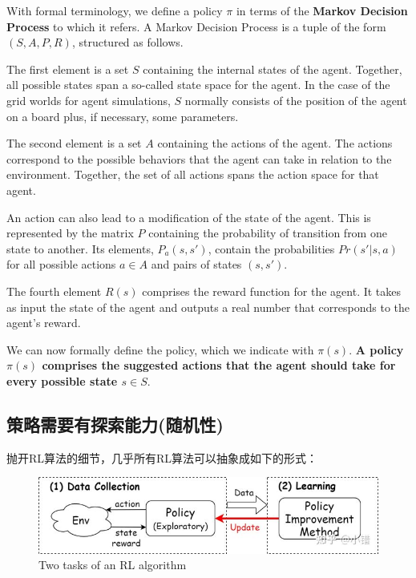 With formal terminology, we define a policy $\pi$ in terms 
of the {\bf Markov Decision Process} to which it refers. 
A Markov Decision Process is a tuple of the form 
$(S, A, P, R)$, structured as follows.

The first element is a set $S$ containing the internal 
states of the agent. Together, all possible states span a 
so-called state space for the agent. In the case of the grid 
worlds for agent simulations, $S$ normally consists of the 
position of the agent on a board plus, if necessary, some 
parameters.

The second element is a set $A$ containing the actions of 
the agent. The actions correspond to the possible behaviors 
that the agent can take in relation to the environment. 
Together, the set of all actions spans the action space for 
that agent.

An action can also lead to a modification of the state of 
the agent. This is represented by the matrix $P$ containing 
the probability of transition from one state to another. 
Its elements, $P_a(s,s')$, contain the probabilities 
$Pr(s' | s, a)$ for all possible actions $a\in A$ and pairs 
of states $(s, s')$.

The fourth element $R(s)$ comprises the reward function for 
the agent. It takes as input the state of the agent and 
outputs a real number that corresponds to the agent's reward.

We can now formally define the policy, which we indicate with 
$\pi(s)$. {\bf A policy $\pi(s)$ comprises the suggested 
actions that the agent should take for every possible 
state $s\in S$}.

\subsection{策略需要有探索能力(随机性)}

抛开RL算法的细节，几乎所有RL算法可以抽象成如下的形式：
\begin{figure}[h]
\centering
\includegraphics[scale=0.5]{pix/exploration.jpg}
\caption{Two tasks of an RL algorithm}
\end{figure}

